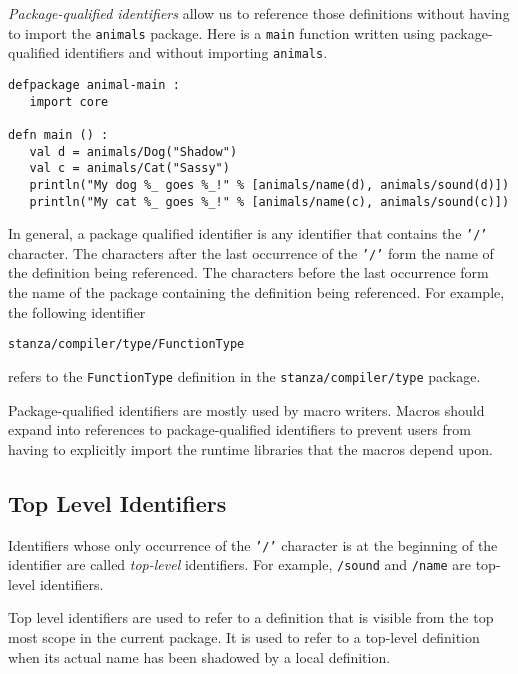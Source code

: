 \documentclass[10pt,oneside]{book}
\begin{document}
{\em Package-qualified identifiers} allow us to reference those definitions without having to import the \texttt{\frenchspacing animals} package. Here is a \texttt{\frenchspacing main} function written using package-qualified identifiers and without importing \texttt{\frenchspacing animals}.
\begin{lstlisting}
defpackage animal-main :
   import core

defn main () :
   val d = animals/Dog("Shadow")
   val c = animals/Cat("Sassy")
   println("My dog %_ goes %_!" % [animals/name(d), animals/sound(d)])
   println("My cat %_ goes %_!" % [animals/name(c), animals/sound(c)])
\end{lstlisting}

In general, a package qualified identifier is any identifier that contains the \texttt{\frenchspacing '/'} character. The characters after the last occurrence of the \texttt{\frenchspacing '/'} form the name of the definition being referenced. The characters before the last occurrence form the name of the package containing the definition being referenced. For example, the following identifier
\begin{lstlisting}
stanza/compiler/type/FunctionType
\end{lstlisting}
refers to the \texttt{\frenchspacing FunctionType} definition in the \texttt{\frenchspacing stanza/compiler/type} package.

Package-qualified identifiers are mostly used by macro writers. Macros should expand into references to package-qualified identifiers to prevent users from having to explicitly import the runtime libraries that the macros depend upon.

\subsection*{Top Level Identifiers}
Identifiers whose only occurrence of the \texttt{\frenchspacing '/'} character is at the beginning of the identifier are called {\em top-level} identifiers. For example, \texttt{\frenchspacing /sound} and \texttt{\frenchspacing /name} are top-level identifiers. 

Top level identifiers are used to refer to a definition that is visible from the top most scope in the current package. It is used to refer to a top-level definition when its actual name has been shadowed by a local definition.
\end{document}
